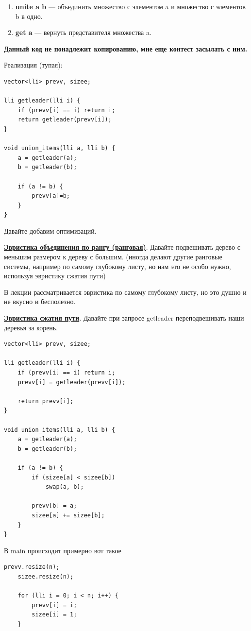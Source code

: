 \documentclass{article}
\newcommand{\deff}[1]{\underline{\textbf{#1}}}
\begin{document}
\begin{enumerate}
    \item \textbf{unite a b} --- объединить множество с элементом a и множество с элементов b в одно.
    \item \textbf{get a} --- вернуть представителя множества a.
\end{enumerate}

\textbf{Данный код не понадлежит копированию, мне еще контест засылать с ним.}

Реализация (тупая):
\begin{lstlisting}[mathescape]
vector<lli> prevv, sizee;
 
lli getleader(lli i) {
    if (prevv[i] == i) return i;
    return getleader(prevv[i]);
}
 
void union_items(lli a, lli b) {
    a = getleader(a);
    b = getleader(b);
 
    if (a != b) {
        prevv[a]=b;
    }
}
\end{lstlisting}

Давайте добавим оптимизаций. 

\deff{Эвристика объединения по рангу (ранговая)}. Давайте  подвешивать дерево с меньшим размером к дереву с большим. (иногда делают другие ранговые системы, например по самому глубокому листу, но нам это не особо нужно, используя эвристику сжатия пути)

В лекции рассматривается эвристика по самому глубокому листу, но это душно и не вкусно и бесполезно.

\deff{Эвристика сжатия пути}. Давайте при запросе getleader переподвешивать наши деревья за корень.

\begin{lstlisting}[mathescape]
vector<lli> prevv, sizee;
 
lli getleader(lli i) {
    if (prevv[i] == i) return i;
    prevv[i] = getleader(prevv[i]);
 
    return prevv[i];
}
 
void union_items(lli a, lli b) {
    a = getleader(a);
    b = getleader(b);
 
    if (a != b) {
        if (sizee[a] < sizee[b])
            swap(a, b);
 
        prevv[b] = a;
        sizee[a] += sizee[b];
    }
}
\end{lstlisting}
В main происходит примерно вот такое
\begin{lstlisting}[mathescape]
    prevv.resize(n);
    sizee.resize(n);
 
    for (lli i = 0; i < n; i++) {
        prevv[i] = i;
        sizee[i] = 1;
    }
\end{lstlisting}
\end{document}
